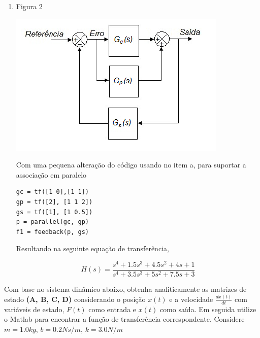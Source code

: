 \documentclass[a4paper, 10pt]{article}
\begin{document}
\begin{list}{\textbf{Questão .}}{
\setlength{\labelwidth}{-2mm} \setlength{\parsep}{0mm}
\setlength{\topsep}{0mm} \setlength{\leftmargin}{0mm}}
\begin{enumerate}
            $$
            H(s) = \frac{2 s^2 + s}{s^4 + 2.5 s^3 + 4 s^2 + 5.5 s + 1}
            $$


        \item
             Figura 2
            \begin{center}
            \includegraphics[scale=0.5]{fig5b.png}
            \end{center}
            
            Com uma pequena alteração do código usando no item a, para suportar
            a associação em paralelo

             \begin{lstlisting}
gc = tf([1 0],[1 1])
gp = tf([2], [1 1 2])
gs = tf([1], [1 0.5])
p = parallel(gc, gp)
f1 = feedback(p, gs)
             \end{lstlisting}

             Resultando na seguinte equação de transferência,

             $$
                H(s) = \frac{s^4 + 1.5 s^3 + 4.5 s^2 + 4 s + 1}{s^4 + 3.5 s^3 + 5 s^2 + 7.5 s + 3}
             $$


    \end{enumerate}


\newpage
\item
  Com base no sistema dinâmico abaixo, obtenha analiticamente as matrizes de estado
  \textbf{(A, B, C, D)} considerando o posição $x(t)$ e a velocidade $\frac{d x(t)}{dt}$
  com variáveis de estado, $F(t)$ como entrada e $x(t)$ como saída. Em seguida utilize
  o Matlab para encontrar a função de transferência correspondente. Considere
  $m=1.0 kg$, $b=0.2 N s/m$, $k=3.0 N/m$


\end{list}
\end{document}
